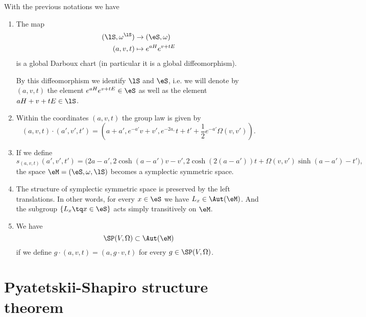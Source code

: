 \begin{proposition}		\label{Prop2807DescSMdarboux}
	With the previous notations we have
	\begin{enumerate}

		\item
			The map
			\begin{equation}
				\begin{aligned}
					(\lS,\omega^{\lS})&\to (\eS,\omega) \\
					(a,v,t)&\mapsto  e^{aH} e^{v+tE}
				\end{aligned}
			\end{equation}
			is a global Darboux chart (in particular it is a global diffeomorphism).
			
			By this diffeomorphism we identify $\lS$ and $\eS$, i.e. we will denote by $(a,v,t)$ the element $ e^{aH}e^{v+tE}\in\eS$ as well as the element $aH+v+tE\in\lS$.
		\item
			Within the coordinates $(a,v,t)$ the group law is given by
			\begin{equation}
				(a,v,t)\cdot (a',v',t')=
				(a+a', e^{-a'}v+v', e^{-2a,}t+t'+\frac{ 1 }{2} e^{-a'}\Omega(v,v')).
			\end{equation}
		\item
			If we define
			\begin{equation}		\label{Eq1807StuctSymM}
				s_{(a,v,t)}(a',v',t')=
				\big(2a-a',2\cosh(a-a')v-v',2\cosh(2(a-a'))t+\Omega(v,v')\sinh(a-a')-t'\big),
			\end{equation}
			the space $\eM=(\eS,\omega,\lS)$ becomes a symplectic symmetric space.

		\item
			The structure of symplectic symmetric space  is preserved by the left translations. In other words, for every $x\in\eS$ we have $L_x\in\Aut(\eM)$. And the subgroup $\{ L_x\tq x\in\eS \}$ acts simply transitively on $\eM$.

		\item
			We have
			\begin{equation}
				\SP(V,\Omega)\subset\Aut(\eM)
			\end{equation}
			if we define $g\cdot(a,v,t)=(a,g\cdot v,t)$ for every $g\in\SP(V,\Omega)$.
	\end{enumerate}
\end{proposition}


\section{Pyatetskii-Shapiro structure theorem}
\label{SecPyateskiiShapiro}


